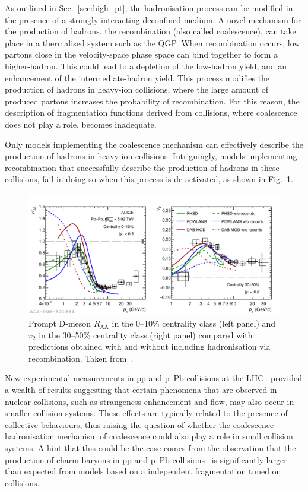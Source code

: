 As outlined in Sec.~\ref{sec:high_pt}, the hadronisation process can be modified in the presence of a strongly-interacting deconfined medium. A novel mechanism for the production of hadrons, the recombination (also called coalescence), can take place in a thermalised system such as the QGP. When recombination occurs, low \pt partons close in the velocity-space phase space can bind together to form a higher-\pt hadron. This could lead to a depletion of the low-\pt hadron yield, and an enhancement of the intermediate-\pt hadron yield. This process modifies the production of hadrons in heavy-ion collisions, where the large amount of produced partons increases the probability of recombination. For this reason, the description of fragmentation functions derived from \ee collisions, where coalescence does not play a role, becomes inadequate. 

Only models implementing the coalescence mechanism can effectively describe the production of hadrons in heavy-ion collisions. Intriguingly, models implementing recombination that successfully describe the production of hadrons in these collisions, fail in doing so when this process is de-activated, as shown in Fig.~\ref{fig:D_recombination}. 

\begin{figure}[htb]
  \centering
  \includegraphics[width=\linewidth]{Figures/Chapter 2/D_Raa010_V23050_FragCoal_3models_1.pdf}
  \caption{Prompt D-meson $R_\mathrm{AA}$ in the 0--10\% centrality class (left panel) and $v_2$ in the 30--50\% centrality class (right panel) compared with predictions obtained with and without including hadronisation via recombination. Taken from~\cite{ALICE:2021rxa}.}
  \label{fig:D_recombination}
\end{figure}

New experimental measurements in pp and p--Pb collisions at the LHC~\cite{ALICE:2016fzo,ALICE:2020wla,ALICE:xic0,ALICE:2020wfu,ALICE:2021bli,CMS:2015fgy} provided a wealth of results suggesting that certain phenomena that are observed in nuclear collisions, such as strangeness enhancement and flow, may also occur in smaller collision systems. These effects are typically related to the presence of collective behaviours, thus raising the question of whether the coalescence hadronisation mechanism of coalescence could also play a role in small collision systems. A hint that this could be the case comes from the observation that the production of charm baryons in pp and p--Pb collisions~\cite{ALICE:2022exq,ALICE:xic0} is significantly larger than expected from models based on a independent fragmentation tuned on \ee collisions. 

